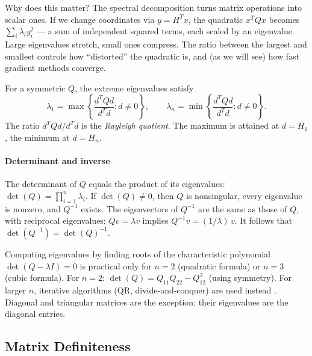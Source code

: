 Why does this matter?
The spectral decomposition turns matrix operations into scalar ones.
If we change coordinates via $y = H^T x$, the quadratic $x^T Q x$ becomes $\sum_i \lambda_i y_i^2$ --- a sum of independent squared terms, each scaled by an eigenvalue.
Large eigenvalues stretch, small ones compress.
The ratio between the largest and smallest controls how ``distorted'' the quadratic is, and (as we will see) how fast gradient methods converge.

\begin{thm}\label{thm:var-eigen}
	For a symmetric $Q$, the extreme eigenvalues satisfy
	\begin{equation}\label{eq:rayleigh-quotient}
		\lambda_1 = \max\left\{\frac{d^T Q d}{d^T d} : d \neq 0\right\},
		\qquad
		\lambda_n = \min\left\{\frac{d^T Q d}{d^T d} : d \neq 0\right\}.
	\end{equation}
	The ratio $d^T Q d / d^T d$ is the \textit{Rayleigh quotient}.
	The maximum is attained at $d = H_1$, the minimum at $d = H_n$.
\end{thm}

\paragraph{Determinant and inverse}

\begin{defn}[Determinant]\label{def:determinant}
	The determinant of $Q$ equals the product of its eigenvalues:
	$\det(Q) = \prod_{i=1}^{n} \lambda_i$.
	If $\det(Q) \neq 0$, then $Q$ is nonsingular, every eigenvalue is nonzero, and $Q^{-1}$ exists.
	The eigenvectors of $Q^{-1}$ are the same as those of $Q$, with reciprocal eigenvalues: $Qv = \lambda v$ implies $Q^{-1}v = (1/\lambda)\, v$.
	It follows that $\det(Q^{-1}) = \det(Q)^{-1}$.
\end{defn}

Computing eigenvalues by finding roots of the characteristic polynomial $\det(Q - \lambda I) = 0$ is practical only for $n = 2$ (quadratic formula) or $n = 3$ (cubic formula).
For $n = 2$: $\det(Q) = Q_{11}Q_{22} - Q_{12}^2$ (using symmetry).
For larger $n$, iterative algorithms (QR, divide-and-conquer) are used instead \cite{nocedal2006}.
Diagonal and triangular matrices are the exception: their eigenvalues are the diagonal entries.


\subsection{Matrix Definiteness}\label{ssec:definiteness}

